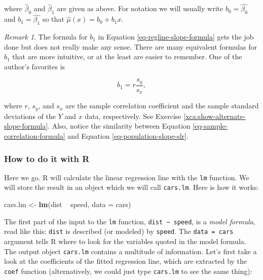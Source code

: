 \documentclass[]{book}
\newenvironment{Shaded}{\begin{snugshade}}{\end{snugshade}}
\newcommand{\KeywordTok}[1]{\textcolor[rgb]{0.13,0.29,0.53}{\textbf{{#1}}}}
\newcommand{\DataTypeTok}[1]{\textcolor[rgb]{0.13,0.29,0.53}{{#1}}}
\newcommand{\StringTok}[1]{\textcolor[rgb]{0.31,0.60,0.02}{{#1}}}
\newcommand{\NormalTok}[1]{{#1}}
\numberwithin{equation}{chapter}
\numberwithin{figure}{chapter}
\theoremstyle{plain}
\theoremstyle{definition}
\theoremstyle{remark}
\newtheorem{rem}[thm]{Remark}
\theoremstyle{definition}
\theoremstyle{definition}
\theoremstyle{remark}
\begin{document}
where \(\hat{\beta}_{0}\) and \(\hat{\beta}_{1}\) are given as above.
For notation we will usually write \(b_{0} = \hat{\beta_{0}}\) and
\(b_{1}=\hat{\beta_{1}}\) so that \(\hat{\mu}(x) = b_{0} + b_{1}x\).

\bigskip

\begin{rem}
The formula for \(b_{1}\) in Equation \eqref{eq-regline-slope-formula}
gets the job done but does not really make any sense. There are many
equivalent formulas for \(b_{1}\) that are more intuitive, or at the
least are easier to remember. One of the author's favorites is

\begin{equation}
\label{eq-sample-correlation-formula} 
b_{1} = r\frac{s_{y}}{s_{x}},
\end{equation}

where \(r\), \(s_{y}\), and \(s_{x}\) are the sample correlation
coefficient and the sample standard deviations of the \(Y\) and \(x\)
data, respectively. See Exercise \ref{xca:show-alternate-slope-formula}.
Also, notice the similarity between Equation
\eqref{eq-sample-correlation-formula} and Equation
\eqref{eq-population-slope-slr}.
\end{rem}

\subsubsection{How to do it with R}\label{how-to-do-it-with-r-48}

Here we go. R will calculate the linear regression line with the
\texttt{lm} function. We will store the result in an object which we
will call \texttt{cars.lm}. Here is how it works:

\begin{Shaded}
\begin{Highlighting}[]
\NormalTok{cars.lm <-}\StringTok{ }\KeywordTok{lm}\NormalTok{(dist ~}\StringTok{ }\NormalTok{speed, }\DataTypeTok{data =} \NormalTok{cars)}
\end{Highlighting}
\end{Shaded}

The first part of the input to the \texttt{lm} function,
\texttt{dist\ \textasciitilde{}\ speed}, is a \emph{model formula}, read
like this: \texttt{dist} is described (or modeled) by \texttt{speed}.
The \texttt{data\ =\ cars} argument tells R where to look for the
variables quoted in the model formula. The output object
\texttt{cars.lm} contains a multitude of information. Let's first take a
look at the coefficients of the fitted regression line, which are
extracted by the \texttt{coef} function (alternatively, we could just
type \texttt{cars.lm} to see the same thing):
\end{document}
